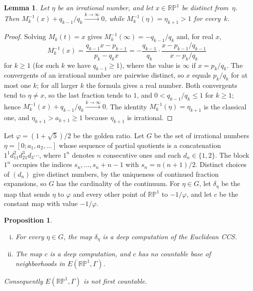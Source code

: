 \documentclass[psamsfonts]{amsart}
\newtheorem{prop}[thm]{Proposition}
\newtheorem{lem}[thm]{Lemma}
\theoremstyle{definition}
\theoremstyle{remark}
\newcommand{\RP}{\mathbb{R}\mathbb{P}}
\numberwithin{equation}{section}
\begin{document}
\begin{lem}\label{lem:euclid-limit}
Let $\eta$ be an irrational number, and let $x\in\RP^1$ be distinct from~$\eta$.
Then $M_k^{-1}(x)+q_{k-1}/q_k\xrightarrow{k\to\infty}0$, while $M_k^{-1}(\eta)=\eta_{k+1}>1$ for every~$k$.
\end{lem}

\begin{proof}
Solving $M_k(t)=x$ gives $M_k^{-1}(\infty)=-q_{k-1}/q_k$ and, for real $x$,
\[
M_k^{-1}(x)=\frac{q_{k-1}x-p_{k-1}}{p_k-q_kx}=-\frac{q_{k-1}}{q_k}\cdot\frac{x-p_{k-1}/q_{k-1}}{x-p_k/q_k}
\]
for $k\ge1$ (for such $k$ we have $q_{k-1}\ge1$), where the value is $\infty$ if $x=p_k/q_k$.
The convergents of an irrational number are pairwise distinct, so $x$ equals
$p_k/q_k$ for at most one $k$; for all larger $k$ the formula gives a real number.
Both convergents tend to $\eta\ne x$, so the last fraction tends to $1$, and
$0<q_{k-1}/q_k\le1$ for $k\ge1$; hence $M_k^{-1}(x)+q_{k-1}/q_k\xrightarrow{k\to\infty}0$.
The identity $M_k^{-1}(\eta)=\eta_{k+1}$ is the classical one, and
$\eta_{k+1}>a_{k+1}\ge1$ because $\eta_{k+1}$ is irrational.
\end{proof}

Let $\varphi=(1+\sqrt5)/2$ be the golden ratio.
Let $G$ be the set of irrational numbers $\eta=[0;a_1,a_2,\dots]$ whose sequence
of partial quotients is a concatenation $1^{1}d_11^{2}d_21^{3}d_3\cdots$, where
$1^n$ denotes $n$ consecutive ones and each $d_n\in\{1,2\}$.
The block $1^n$ occupies the indices $s_n,\dots,s_n+n-1$ with $s_n=n(n+1)/2$.
Distinct choices of $(d_n)$ give distinct numbers, by the uniqueness of
continued fraction expansions, so $G$ has the cardinality of the continuum.
For $\eta\in G$, let $\delta_\eta$ be the map that sends $\eta$ to $\varphi$
and every other point of $\RP^1$ to $-1/\varphi$, and let $c$ be the constant map with value $-1/\varphi$.

\begin{prop}\label{prop:euclid}
\begin{enumerate}[(i)]
\item For every $\eta\in G$, the map $\delta_\eta$ is a deep computation of the
Euclidean CCS.
\item The map $c$ is a deep computation, and $c$
has no countable base of neighborhoods in $E(\RP^1,\Gamma)$.
\end{enumerate}
Consequently $E(\RP^1,\Gamma)$ is not first countable.
\end{prop}
\end{document}
